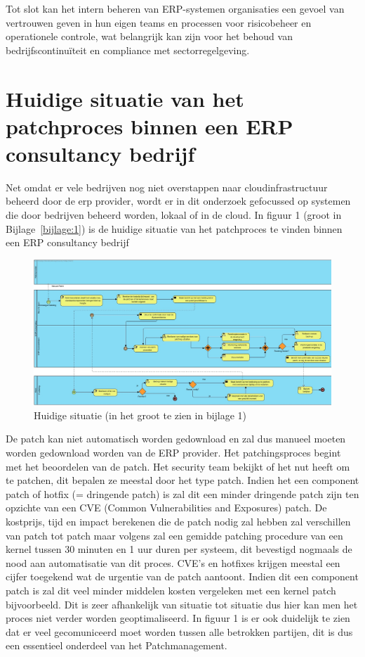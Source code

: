 \documentclass[dutch,dit,thesis]{hogentreport}
\begin{document}
Tot slot kan het intern beheren van ERP-systemen organisaties een gevoel van vertrouwen geven in hun eigen teams en processen voor risicobeheer en operationele controle, wat belangrijk 
kan zijn voor het behoud van bedrijfscontinuïteit en compliance met sectorregelgeving.\\


\section{Huidige situatie van het patchproces binnen een ERP consultancy bedrijf}

Net omdat er vele bedrijven nog niet overstappen naar cloudinfrastructuur beheerd door de erp provider, wordt er in dit onderzoek gefocussed op systemen die door bedrijven beheerd worden, lokaal of in de cloud. In figuur 1 (groot in Bijlage~\ref{bijlage:1}) is de huidige situatie van het patchproces te vinden binnen een ERP consultancy bedrijf \\

\begin{figure}[htbp]
    \centering
    \includegraphics[width=\textwidth]{huidigesituatie.jpg}
    \caption{Huidige situatie (in het groot te zien in bijlage 1)}
    \label{fig:huidigesituatie}
\end{figure}

De patch kan niet automatisch worden gedownload en zal dus manueel moeten worden gedownload worden van de ERP provider. Het patchingsproces begint met het beoordelen van de patch. Het security team bekijkt of het nut heeft
om te patchen, dit bepalen ze meestal door het type patch. Indien het een component patch of hotfix (= dringende patch) is zal dit een minder dringende patch zijn ten opzichte van een CVE (Common Vulnerabilities and Exposures) patch. De kostprijs, tijd en impact berekenen
die de patch nodig zal hebben zal verschillen van patch tot patch maar volgens \textcite{Heyndrickx2024} zal een gemidde patching procedure van een kernel tussen 30 minuten en 1 uur duren per systeem, dit bevestigd nogmaals de nood aan automatisatie van dit proces. CVE's en hotfixes krijgen meestal een cijfer toegekend wat de urgentie van de patch aantoont. Indien dit een component patch is zal dit veel minder middelen kosten vergeleken
met een kernel patch bijvoorbeeld. Dit is zeer afhankelijk van situatie tot situatie dus hier kan men het proces niet verder worden geoptimaliseerd. In figuur 1 is er ook duidelijk te zien dat er veel gecomuniceerd moet worden tussen alle betrokken partijen, dit is dus een essentieel onderdeel van het Patchmanagement. \\
\end{document}
